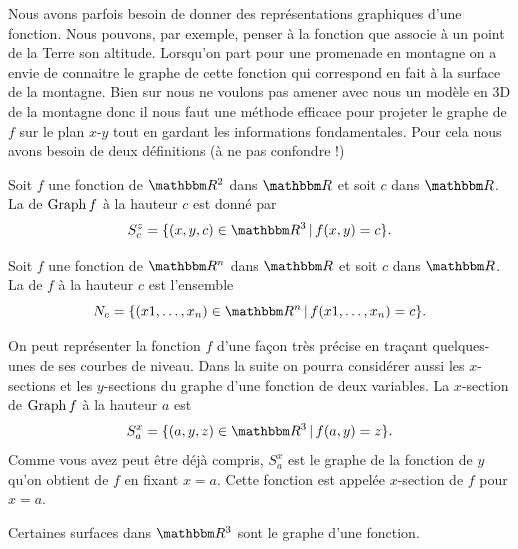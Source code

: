 Nous avons parfois besoin de donner des représentations graphiques d'une fonction. Nous pouvons, par exemple, penser à la fonction que associe à un point de la Terre son altitude. Lorsqu'on part pour une promenade en montagne on a envie de connaitre le graphe de cette fonction qui correspond en fait à la surface de la montagne. Bien sur nous ne voulons pas amener avec nous un modèle en 3D de la montagne donc il nous faut une méthode efficace pour projeter le graphe de $f$ sur le plan $x$-$y$ tout en gardant les informations fondamentales. Pour cela nous avons besoin de deux définitions (à ne pas confondre !)
\begin{definition}
	Soit $f$ une fonction de $\eR^2$ dans $\eR$ et soit $c$ dans $\eR$.  La  de $\operatorname{Graph} f$ à la hauteur $c$ est donné par
\[
S^z_c=\{ (x,y,c)\in \eR^3\,|\, f(x,y)=c\}.
\]
\end{definition}

\begin{definition}\label{def_niveau}
	Soit $f$ une fonction de $\eR^n$ dans $\eR$ et soit $c$ dans $\eR$. La  de $f$ à la hauteur $c$ est l'ensemble
    \begin{equation}
        N_c=\{ (x1,\ldots, x_n)\in \eR^n\,|\, f(x1,\ldots, x_n)=c\}.
    \end{equation}
\end{definition}
On peut représenter la fonction $f$ d'une façon très précise en traçant quelques-unes de ses courbes de niveau.  Dans la suite on pourra considérer aussi les $x$-sections et les $y$-sections du graphe d'une fonction de deux variables. La $x$-section de $\operatorname{Graph} f$ à la hauteur $a$ est
\[
S^x_a=\{(a,y,z)\in\eR^3\,|\, f(a,y)=z\}.
\]
Comme vous avez peut être déjà compris, $S^x_a$ est le graphe de la fonction de $y$ qu'on obtient de $f$ en fixant $x=a$. Cette fonction est appelée $x$-section de $f$ pour $x=a$.

Certaines surfaces dans $\eR^3$ sont le graphe d'une fonction.

